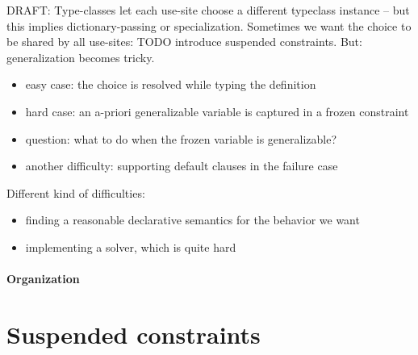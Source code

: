 \documentclass[acmsmall,screen,nonacm]{acmart}
\begin{document}
DRAFT: Type-classes let each use-site choose a different typeclass instance
-- but this implies dictionary-passing or specialization. Sometimes we want
the choice to be shared by all use-sites: TODO introduce suspended
constraints. But: generalization becomes tricky.
\begin{itemize}
\item easy case: the choice is resolved while typing the definition
\item hard case: an a-priori generalizable variable is captured in a frozen
   constraint 
\item question: what to do when the frozen variable is generalizable?
\item another difficulty: supporting default clauses in the failure case
\end{itemize}

Different kind of difficulties:
\begin{itemize}
\item finding a reasonable declarative semantics for the behavior we want
\item implementing a solver, which is quite hard
\end{itemize}




\paragraph{Organization} 

\section{Suspended constraints}
\end{document}
